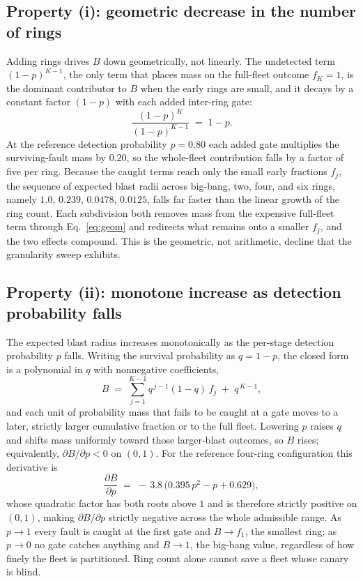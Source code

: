 \documentclass[journal]{IEEEtran}
\begin{document}
\subsection{Property (i): geometric decrease in the number of rings}
Adding rings drives $B$ down geometrically, not linearly. The undetected term $(1-p)^{K-1}$, the only
term that places mass on the full-fleet outcome $f_K = 1$, is the dominant contributor to $B$ when
the early rings are small, and it decays by a constant factor $(1-p)$ with each added inter-ring
gate:
\begin{equation}
\frac{(1-p)^{K}}{(1-p)^{K-1}} \;=\; 1 - p .
\label{eq:geom}
\end{equation}
At the reference detection probability $p = 0.80$ each added gate multiplies the surviving-fault mass
by $0.20$, so the whole-fleet contribution falls by a factor of five per ring. Because the caught
terms reach only the small early fractions $f_j$, the sequence of expected blast radii across
big-bang, two, four, and six rings, namely $1.0$, $0.239$, $0.0478$, $0.0125$, falls far faster than
the linear growth of the ring count. Each subdivision both removes mass from the expensive
full-fleet term through Eq.~\eqref{eq:geom} and redirects what remains onto a smaller $f_j$, and the
two effects compound. This is the geometric, not arithmetic, decline that the granularity sweep
exhibits.

\subsection{Property (ii): monotone increase as detection probability falls}
The expected blast radius increases monotonically as the per-stage detection probability $p$ falls.
Writing the survival probability as $q = 1 - p$, the closed form is a polynomial in $q$ with
nonnegative coefficients,
\begin{equation}
B \;=\; \sum_{j=1}^{K-1} q^{\,j-1}(1-q)\, f_j \;+\; q^{\,K-1},
\label{eq:Bq}
\end{equation}
and each unit of probability mass that fails to be caught at a gate moves to a later, strictly larger
cumulative fraction or to the full fleet. Lowering $p$ raises $q$ and shifts mass uniformly toward
those larger-blast outcomes, so $B$ rises; equivalently, $\partial B / \partial p < 0$ on $(0,1)$.
For the reference four-ring configuration this derivative is
\begin{equation}
\frac{\partial B}{\partial p}
\;=\; -\,3.8\,\big(0.395\,p^{2} - p + 0.629\big),
\label{eq:dBdp}
\end{equation}
whose quadratic factor has both roots above $1$ and is therefore strictly positive on $(0,1)$, making
$\partial B / \partial p$ strictly negative across the whole admissible range. As $p \to 1$ every
fault is caught at the first gate and $B \to f_1$, the smallest ring; as $p \to 0$ no gate catches
anything and $B \to 1$, the big-bang value, regardless of how finely the fleet is partitioned. Ring
count alone cannot save a fleet whose canary is blind.
\end{document}
